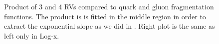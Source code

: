 \documentclass[12pt]{article}
\begin{document}
\begin{figure}[htbp]
\centering
{}
\caption{Product of 3 and 4 RVs compared to quark and gluon fragmentation functions. The product is is fitted in the middle region in order to extract the exponential slope as we did in \cite{Adler:2006sc}. Right plot is the same as left only in Log-x.}
\label{fig:sumProd}
\end{figure}
\end{document}
